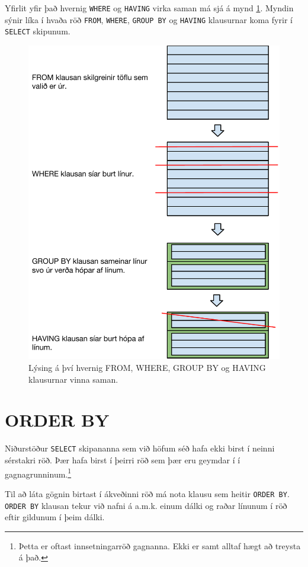 Yfirlit yfir það hvernig \verb|WHERE| og \verb|HAVING| virka saman má sjá á mynd \ref{mynd:group-by-having}. Myndin sýnir líka í hvaða röð \verb|FROM|, \verb|WHERE|, \verb|GROUP BY| og \verb|HAVING| klausurnar koma fyrir í \verb|SELECT| skipunum.
\begin{figure}
\caption[FROM, WHERE, GROUP BY og HAVING]{Lýsing á því hvernig FROM, WHERE, GROUP BY og HAVING klausurnar vinna saman.}
\label{mynd:group-by-having}
\centering
\includegraphics[width=\linewidth]{myndir/group-by-having}
\end{figure}

\section{ORDER BY}
Niðurstöður \verb|SELECT| skipananna sem við höfum séð hafa ekki birst í neinni sérstakri röð. Þær hafa birst í þeirri röð sem þær eru geymdar í í gagnagrunninum.\footnote{Þetta er oftast innsetningarröð gagnanna. Ekki er samt alltaf hægt að treysta á það.}

Til að láta gögnin birtast í ákveðinni röð má nota klausu sem heitir \verb|ORDER BY|. \verb|ORDER BY| klausan tekur við nafni á a.m.k. einum dálki og raðar línunum í röð eftir gildunum í þeim dálki.

